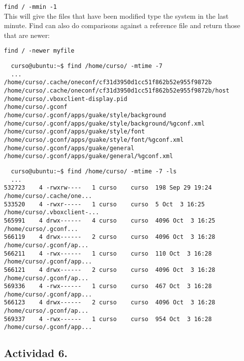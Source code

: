\documentclass[a4paper,11pt,spanish]{article} %
\newenvironment{myscriptlisting}
{\begin{list}{}{\setlength{\leftmargin}{1em}}\item\scriptsize\bfseries}
{\end{list}}
\begin{document}
\texttt{find / -mmin -1}\\

This will give the files that have been modified type the system in the last minute.
Find can also do comparisons against a reference file and return those that are newer:

\texttt{find / -newer myfile}\\

\cite{digitalocean}

\begin{myscriptlisting}
 \begin{verbatim}
  curso@ubuntu:~$ find /home/curso/ -mtime -7
  ...
/home/curso/.cache/oneconf/cf31d3950d1cc51f862b52e955f9872b
/home/curso/.cache/oneconf/cf31d3950d1cc51f862b52e955f9872b/host
/home/curso/.vboxclient-display.pid
/home/curso/.gconf
/home/curso/.gconf/apps/guake/style/background
/home/curso/.gconf/apps/guake/style/background/%gconf.xml
/home/curso/.gconf/apps/guake/style/font
/home/curso/.gconf/apps/guake/style/font/%gconf.xml
/home/curso/.gconf/apps/guake/general
/home/curso/.gconf/apps/guake/general/%gconf.xml
 \end{verbatim}
\end{myscriptlisting}

\begin{myscriptlisting}
 \begin{verbatim}
  curso@ubuntu:~$ find /home/curso/ -mtime -7 -ls
  ...
532723    4 -rwxrw----   1 curso    curso  198 Sep 29 19:24 /home/curso/.cache/one...
533520    4 -rwxr-----   1 curso    curso  5 Oct  3 16:25 /home/curso/.vboxclient-...
565991    4 drwx------   4 curso    curso  4096 Oct  3 16:25 /home/curso/.gconf...
566119    4 drwx------   2 curso    curso  4096 Oct  3 16:28 /home/curso/.gconf/ap...
566211    4 -rwx------   1 curso    curso  110 Oct  3 16:28 /home/curso/.gconf/app...
566121    4 drwx------   2 curso    curso  4096 Oct  3 16:28 /home/curso/.gconf/ap...
569336    4 -rwx------   1 curso    curso  467 Oct  3 16:28 /home/curso/.gconf/app...
566123    4 drwx------   2 curso    curso  4096 Oct  3 16:28 /home/curso/.gconf/ap...
569337    4 -rwx------   1 curso    curso  954 Oct  3 16:28 /home/curso/.gconf/app...
 \end{verbatim}
\end{myscriptlisting}
 

\subsection{Actividad 6.}
\end{document}
